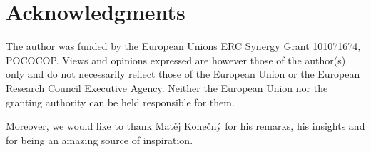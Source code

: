 \documentclass[preprint,12pt]{elsarticle}
\begin{document}
\section*{Acknowledgments}


The author was funded by the European Unions ERC Synergy Grant 101071674, POCOCOP.
Views and opinions expressed are however those of the author(s) only and do not necessarily reflect those of the European Union or the European Research Council Executive Agency. Neither the European Union nor the granting authority can be held responsible for them.

Moreover, we would like to thank Mat\v{e}j Kone\v{c}n\'y for his remarks, his insights and for being an amazing source of inspiration.



 
\end{document}
